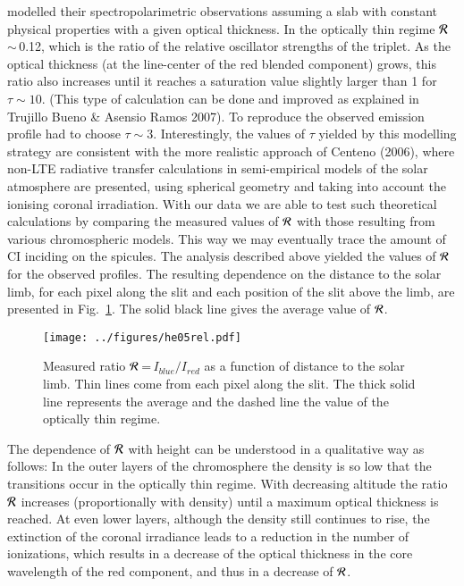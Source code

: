 \citet{truj05} {modelled their spectropolarimetric observations assuming a slab with constant physical properties with a given optical thickness}. In the optically thin regime $\cal R$\,$\sim$\,0.12, which is the ratio of the relative oscillator strengths of the triplet. As the optical
thickness (at the line-center of the red blended component) grows, this ratio also increases 
until it reaches a saturation value slightly larger than 1 for $\tau\sim10$. (This type of calculation can be done and improved as explained in Trujillo Bueno \& Asensio Ramos 2007). To reproduce the observed emission profile \citet{truj05} had to choose $\tau \sim 3$. Interestingly, {  the values of $\tau$ yielded by this modelling strategy are consistent} with the more realistic 
approach of Centeno (2006), where non-LTE radiative transfer calculations in 
semi-empirical models of the solar atmosphere are presented, using spherical 
geometry and taking into account the ionising coronal irradiation.
With our data we are able to test such theoretical calculations by comparing 
the measured values of $\cal R$ with those resulting from various chromospheric
models. This way we may eventually trace the amount of CI inciding on the 
spicules. The analysis described above yielded the 
values of $\cal R$ for the observed profiles. The resulting dependence on 
the distance to the solar
limb, for each pixel along the slit and each position of the slit above the
limb, are presented in Fig.~\ref{fig:ratios}. The solid black line gives the average value of $\cal R$.

\begin{figure}[t]
\center \texttt{[image: ../figures/he05rel.pdf]}
\caption{Measured ratio $\cal R$\,=\,$I_{blue}/I_{red}$ as a function of
  distance to the solar limb. Thin lines come from
  each pixel along the slit. The thick solid line represents the average and the dashed line the value of the optically thin regime.} 
\label{fig:ratios}
\end{figure}

The dependence of $\cal R$ with height can be understood in a qualitative way as
follows: In the outer layers of the chromosphere the density is so low 
that the transitions occur in the optically thin regime. 
With decreasing altitude the ratio $\cal R$ increases (proportionally with 
density) until a maximum optical thickness is reached.  At even lower 
layers, although the density still continues to rise,  the extinction of the coronal
irradiance leads to a reduction in the number of ionizations, which results 
in a decrease of the optical thickness in the core wavelength of the red 
component, {  and thus in a decrease of $\cal R$.}

